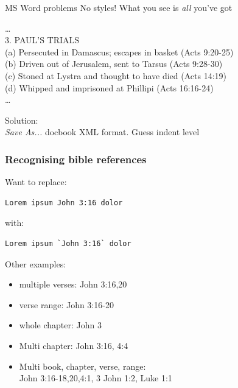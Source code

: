 \documentclass{beamer}
\begin{document}
\begin{frame}{MS Word problems}
No styles! What you see is \emph{all} you've got

    \begin{framed} %
        \ldots\\
3. PAUL'S TRIALS\\
\quad (a) Persecuted in Damascus; escapes in basket (Acts 9:20-25)\\
\quad (b) Driven out of Jerusalem, sent to Tarsus (Acts 9:28-30)\\
\quad (c) Stoned at Lystra and thought to have died (Acts 14:19)\\
\quad (d) Whipped and imprisoned at Phillipi (Acts 16:16-24)\\
\ldots
\end{framed}
Solution:\\
\emph{Save As...} docbook XML format. Guess indent level
\end{frame}

\begin{frame}[fragile]
    \frametitle{Recognising bible references}
     Want to replace:\\
     \begin{verbatim}Lorem ipsum John 3:16 dolor
\end{verbatim}
     with:\\
 \begin{verbatim}Lorem ipsum `John 3:16` dolor
\end{verbatim}
Other examples:
\begin{itemize}
\item multiple verses: John 3:16,20
\item verse range: John 3:16-20
\item whole chapter: John 3
\item Multi chapter: John 3:16, 4:4
\item Multi book, chapter, verse, range:\\
    John 3:16-18,20,4:1, 3 John 1:2, Luke 1:1
\end{itemize}
\end{frame}
\end{document}
